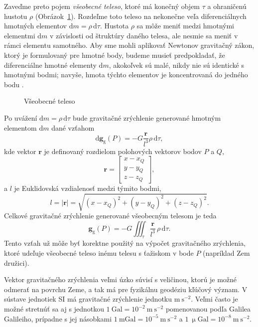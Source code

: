 \documentclass[a4paper, 12pt]{book}
\newcommand{\diff}{\mathrm d}
\newcommand{\gidx}{\mathrm g}
\let\vec\mathbf
\begin{document}
Zaveďme preto pojem \emph{všeobecné teleso}, ktoré má konečný objem $\tau$ 
a ohraničenú hustotu $\rho$ (Obrázok~\ref{fig:gravitating_body}).  Rozdeľme 
toto teleso na nekonečne veľa diferenciálnych hmotných elementov $\diff 
m = \rho \, \diff \tau$.  Hustota $\rho$ sa môže meniť medzi hmotnými elementmi 
$\diff m$ v závislosti od štruktúry daného telesa, ale nesmie sa meniť v rámci 
elementu samotného.  Aby sme mohli aplikovať Newtonov gravitačný zákon, ktorý 
je formulovaný pre hmotné body, budeme musieť predpokladať, že diferenciálne 
hmotné elementy $\diff m$, akokoľvek sú malé, nikdy nie sú identické s hmotnými 
bodmi; navyše, hmota týchto elementov je koncentrovaná do jedného bodu 
\citep{Kellogg1967}.

\begin{figure}
\centering

\caption{Všeobecné teleso}
\label{fig:gravitating_body}
\end{figure}

Po uvážení $\diff m = \rho \, \diff \tau$ bude gravitačné zrýchlenie generované 
hmotným elementom $\diff m$ dané vzťahom
%
\begin{equation}
\diff \vec g_\gidx(P) = -G \frac{\vec r}{l^3} \rho \, \diff\tau{,}
\end{equation}
%
kde vektor $\vec r$ je definovaný rozdielom polohových vektorov bodov $P$ 
a $Q$,
%
\begin{equation}
\label{eq:r}
\vec r = 
%
\begin{bmatrix}
x - x_Q \\
y - y_Q \\
z - z_Q
\end{bmatrix}
{,}
\end{equation}
%
a $l$ je Euklidovská vzdialenosť medzi týmito bodmi,
%
\begin{equation}
\label{eq:l}
l = | \vec r | = \sqrt{(x - x_Q)^2 + (y - y_Q)^2 + (z - z_Q)^2}{.}
\end{equation}
%
Celkové gravitačné zrýchlenie generované všeobecným telesom je teda
%
\begin{equation}
\label{eq:gg_body}
\vec g_\gidx(P) = -G \iiint_{\tau} \frac{\vec r}{l^3} \, \rho \, \diff\tau{.}
\end{equation}
%
Tento vzťah už môže byť korektne použitý na výpočet gravitačného zrýchlenia, 
ktoré udeľuje všeobecné teleso inému telesu s ťažiskom v bode $P$ (napríklad 
Zem družici).

Vektor gravitačného zrýchlenia veľmi úzko súvisí s veličinou, ktorú je možné 
odmerať na povrchu Zeme, a tak má pre fyzikálnu geodéziu kľúčový význam.  
V sústave jednotiek SI má gravitačné zrýchlenie jednotku $\mathrm{m}\ 
\mathrm{s}^{-2}$.  Veľmi často je možné stretnúť sa aj s jednotkou $1\ 
\mathrm{Gal} = 10^{-2}\ \mathrm{m}\ \mathrm{s}^{-2}$ pomenovanou podľa Galilea 
Galileiho, prípadne s jej násobkami $1\ \mathrm{mGal} = 10^{-5}\ \mathrm{m}\ 
\mathrm{s}^{-2}$ a $1\ \upmu \mathrm{Gal} = 10^{-8}\ \mathrm{m}\ 
\mathrm{s}^{-2}$.
\end{document}
